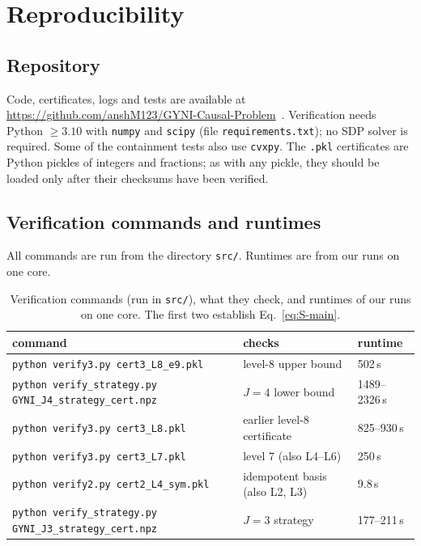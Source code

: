 \documentclass[aps,pra,onecolumn,notitlepage,superscriptaddress,longbibliography,nofootinbib,11pt]{revtex4-2}
\theoremstyle{remark}
\newcommand{\file}[1]{\texttt{#1}}
\begin{document}
\section{Reproducibility}\label{sec:repro}

\subsection{Repository}

Code, certificates, logs and tests are available at \url{https://github.com/anshM123/GYNI-Causal-Problem}~\cite{repo}.
Verification needs Python $\ge3.10$ with \file{numpy} and \file{scipy} (file \file{requirements.txt}); no SDP solver is required. Some of the containment tests also use \file{cvxpy}. The \file{.pkl} certificates are Python pickles of integers and fractions; as with any pickle, they should be loaded only after their checksums have been verified.

\subsection{Verification commands and runtimes}

All commands are run from the directory \file{src/}. Runtimes are from our runs on one core.

\begin{table}[h]
\caption{Verification commands (run in \file{src/}), what they check, and runtimes of our runs on one core. The first two establish Eq.~\eqref{eq:S-main}.}
\label{tab:S-commands}
\footnotesize
\begin{ruledtabular}
\begin{tabular}{lll}
command & checks & runtime\\
\hline
\file{python verify3.py cert3\_L8\_e9.pkl} & level-8 upper bound & 502\,s\\
\file{python verify\_strategy.py GYNI\_J4\_strategy\_cert.npz} & $J=4$ lower bound & 1489--2326\,s\\
\file{python verify3.py cert3\_L8.pkl} & earlier level-8 certificate & 825--930\,s\\
\file{python verify3.py cert3\_L7.pkl} & level 7 (also L4--L6) & 250\,s\\
\file{python verify2.py cert2\_L4\_sym.pkl} & idempotent basis (also L2, L3) & 9.8\,s\\
\file{python verify\_strategy.py GYNI\_J3\_strategy\_cert.npz} & $J=3$ strategy & 177--211\,s\\
\end{tabular}
\end{ruledtabular}
\end{table}
\end{document}
